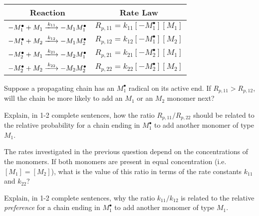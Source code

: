 \begin{activity}[Copolymerization]
\begin{model}
	\begin{center}
		\renewcommand{\arraystretch}{1.8}
		\begin{tabular}{|c|c|}
			\hline
			\textbf{Reaction} & \textbf{Rate Law} \\\hline
			$-M_1^\bullet + M_1 \xlongrightarrow{k_{11}} -M_1M_1^\bullet$ & $R_{p,11} = k_{11}[-M_1^\bullet][M_1]$ \\\hline
			$-M_1^\bullet + M_2 \xlongrightarrow{k_{12}} -M_1M_2^\bullet$ & $R_{p,12} = k_{12}[-M_1^\bullet][M_2]$ \\\hline
			$-M_2^\bullet + M_1 \xlongrightarrow{k_{21}} -M_2M_1^\bullet$ & $R_{p,21} = k_{21}[-M_2^\bullet][M_1]$ \\\hline
			$-M_2^\bullet + M_2 \xlongrightarrow{k_{22}} -M_2M_2^\bullet$ & $R_{p,22} = k_{22}[-M_2^\bullet][M_2]$ \\\hline
		\end{tabular}
	\end{center}

\end{model}

\begin{ctqs}

	\question Suppose a propagating chain has an $M_1^\bullet$ radical on its active end.  If $R_{p,11}>R_{p,12}$, will the chain be more likely to add an $M_1$ or an $M_2$ monomer next?
	
		\begin{solution}[0.5in]
		\end{solution}
	
	\question Explain, in 1-2 complete sentences, how the ratio $R_{p,11}/R_{p,22}$ should be related to the relative probability for a chain ending in $M_1^\bullet$ to add another monomer of type $M_1$.
	
		\begin{solution}[1in]
		\end{solution}
	
	\question The rates investigated in the previous question depend on the concentrations of the monomers.  If both monomers are present in equal concentration (i.e. $[M_1]=[M_2]$), what is the value of this ratio in terms of the rate constants $k_{11}$ and $k_{22}$?
	
		\begin{solution}[1in]
		\end{solution}
	
	\question Explain, in 1-2 complete sentences, why the ratio $k_{11}/k_{12}$ is related to the relative \emph{preference} for a chain ending in $M_1^\bullet$ to add another monomer of type $M_1$.
	

\end{ctqs}
\end{activity}
